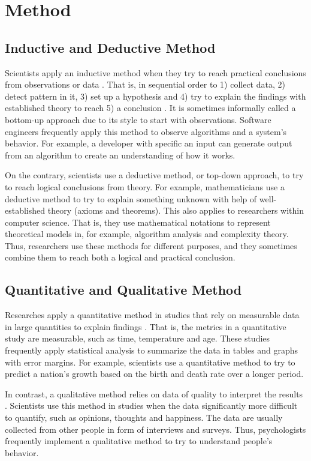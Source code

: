 \documentclass[a4paper,11pt]{kth-mag}
\newcommand*{\skippara}{\par\vspace{\baselineskip} \noindent}
\begin{document}
\chapter{Method}

\section{Inductive and Deductive Method}
Scientists apply an inductive method when they try to reach practical conclusions from observations or data \cite{Omexperi69:online}.
That is, in sequential order to 1) collect data, 2) detect pattern in it, 3) set up a hypothesis and 4) try to explain the findings with established theory to reach 5) a conclusion \cite{web:induction}.
It is sometimes informally called a bottom-up approach due to its style to start with observations.
Software engineers frequently apply this method to observe algorithms and a system's behavior.
For example, a developer with specific an input can generate output from an algorithm to create an understanding of how it works.

\skippara On the contrary, scientists use a deductive method, or top-down approach, to try to reach logical conclusions from theory.
For example, mathematicians use a deductive method to try to explain something unknown with help of well-established theory (axioms and theorems).
This also applies to researchers within computer science.
That is, they use mathematical notations to represent theoretical models in, for example, algorithm analysis and complexity theory.
Thus, researchers use these methods for different purposes, and they sometimes combine them to reach both a logical and practical conclusion.

\section{Quantitative and Qualitative Method}

Researches apply a quantitative method in studies that rely on measurable data in large quantities to explain findings \cite{haakansson2013portal}.
That is, the metrics in a quantitative study are measurable, such as time, temperature and age.
These studies frequently apply statistical analysis to summarize the data in tables and graphs with error margins.
For example, scientists use a quantitative method to try to predict a nation's growth based on the birth and death rate over a longer period.

\skippara In contrast, a qualitative method relies on data of quality to interpret the results \cite{merriam2009qualitative}.
Scientists use this method in studies when the data significantly more difficult to quantify, such as opinions, thoughts and happiness.
The data are usually collected from other people in form of interviews and surveys.
Thus, psychologists frequently implement a qualitative method to try to understand people's behavior.
\end{document}
